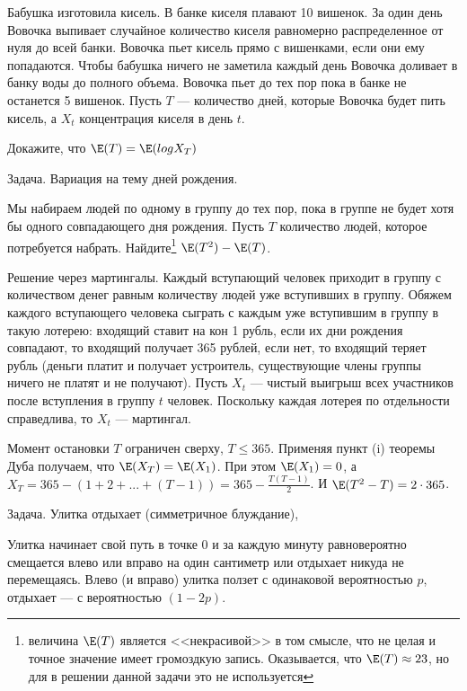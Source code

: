 Бабушка изготовила кисель. В банке киселя плавают 10 вишенок. За один день Вовочка выпивает случайное количество киселя равномерно распределенное от нуля до всей банки. Вовочка пьет кисель прямо с вишенками, если они ему попадаются. Чтобы бабушка ничего не заметила каждый день Вовочка доливает в банку воды до полного объема.
Вовочка пьет до тех пор пока в банке не останется 5 вишенок. Пусть $T$ --- количество дней, которые Вовочка будет пить кисель, а $X_{t}$ концентрация киселя в день $t$.

Докажите, что $\E(T)=\E(log X_{T})$ 






Задача. Вариация на тему дней рождения.

Мы набираем людей по одному в группу до тех пор, пока в группе не будет хотя бы одного совпадающего дня рождения. Пусть $T$ количество людей, которое потребуется набрать. Найдите\footnote{величина $\E(T)$ является <<некрасивой>> в том смысле, что не целая и точное значение имеет громоздкую запись. Оказывается, что $\E(T)\approx 23$, но для в решении данной задачи это не используется} $\E(T^{2})-\E(T)$. 

Решение через мартингалы. Каждый вступающий человек приходит в группу с количеством денег равным количеству людей уже вступивших в группу. Обяжем каждого вступающего человека сыграть с каждым уже вступившим в группу в такую лотерею: входящий ставит на кон 1 рубль, если их дни рождения совпадают, то входящий получает 365 рублей, если нет, то входящий теряет рубль (деньги платит и получает устроитель, существующие члены группы ничего не платят и не получают). Пусть $X_{t}$ --- чистый выигрыш всех участников после вступления в группу $t$ человек. Поскольку каждая лотерея по отдельности справедлива, то $X_{t}$ --- мартингал. 

Момент остановки $T$ ограничен сверху, $T\leq 365$. Применяя пункт (i) теоремы Дуба получаем, что $\E(X_{T})=\E(X_{1})$. При этом $\E(X_{1})=0$, а $X_{T}=365-(1+2+...+(T-1))=365-\frac{T(T-1)}{2}$. И $\E(T^{2}-T)=2\cdot 365$.

Задача. Улитка отдыхает (симметричное блуждание), \cite{blom:pspt}

Улитка начинает свой путь в точке 0 и за каждую минуту равновероятно смещается влево или вправо на один сантиметр или отдыхает никуда не перемещаясь. Влево (и вправо) улитка ползет с одинаковой вероятностью $p$, отдыхает --- с вероятностью $(1-2p)$. 

